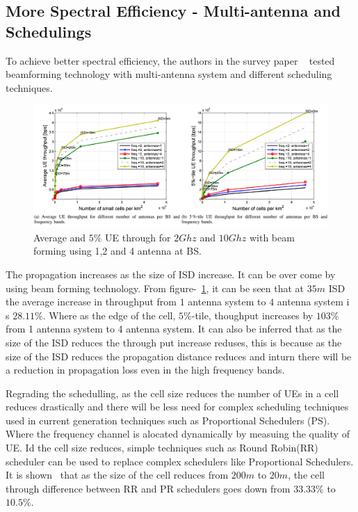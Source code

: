 \documentclass[12pt,onecolumn]{IEEEtran}
\begin{document}
\subsection{More Spectral Efficiency - Multi-antenna and Schedulings}
\label{subsec:MSE}

To achieve better spectral efficiency, the authors in the survey paper ~\cite{main_paper} tested beamforming technology with multi-antenna system and different scheduling techniques.

\begin{figure}[ht]
\includegraphics[scale=0.32]{beam_form}
\centering
\caption{Average and $5\%$ UE through for $2Ghz$ and $10Ghz$ with beam forming using 1,2 and 4 antenna at BS.~\cite{main_paper}}
\label{fig:BF}
\end{figure}

The propagation increases as the size of ISD increase. It can be over come by using beam forming technology. From figure-~\ref{fig:BF}, it can be seen that at $35m$ ISD the average increase in throughput from $1$ antenna system to $4$ antenna system i s $28.11\%$. Where as the edge of the cell, $5\%$-tile, thoughput increases by $103\%$ from 1 antenna system to 4 antenna system. It can also be inferred that as the size of the ISD reduces the through put increase reduses, this is because as the size of the ISD reduces the propagation distance reduces and inturn there will be a reduction in propagation loss even in the high frequency bands.

Regrading the schedulling, as the cell size reduces the number of UEs in a cell reduces drastically and there will be less need for complex scheduling techniques used in current generation techniques such as Proportional Schedulers (PS). Where the frequency channel is alocated dynamically by measuing the quality of UE. Id the cell size reduces, simple techniques such as Round Robin(RR) scheduler can be used to replace complex schedulers like Proportional Schedulers. It is shown~\cite{main_paper} that as the size of the cell reduces from $200m$ to $20m$, the cell through difference between RR and PR schedulers goes down from $33.33\%$ to $10.5\%$.
\end{document}
